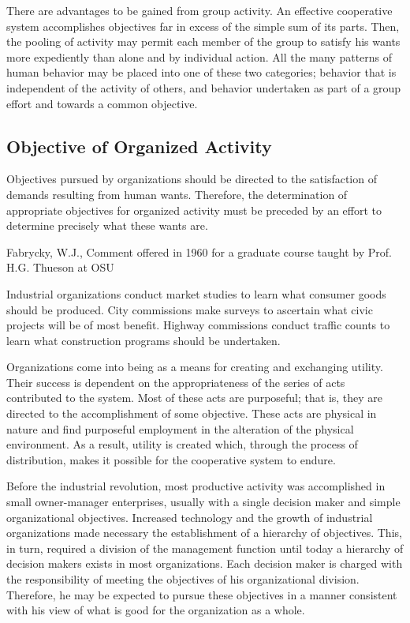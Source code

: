 There are advantages to be gained from group activity. An effective cooperative system accomplishes objectives far in excess of the simple sum of its parts. Then, the pooling of activity may permit each member of the group to satisfy his wants more expediently than alone and by individual action. All the many patterns of human behavior may be placed into one of these two categories; behavior that is independent of the activity of others, and behavior undertaken as part of a group effort and towards a common objective.

\subsection{Objective of Organized Activity}

Objectives pursued by organizations should be directed to the satisfaction of demands resulting from human wants. Therefore, the determination of appropriate objectives for organized activity must be preceded by an effort to determine precisely what these wants are. 

Fabrycky, W.J., Comment offered in 1960 for a graduate course taught by Prof. H.G. Thueson at OSU

Industrial organizations conduct market studies to learn what consumer goods should be produced. City commissions make surveys to ascertain what civic projects will be of most benefit. Highway commissions conduct traffic counts to learn what construction programs should be undertaken.

Organizations come into being as a means for creating and exchanging utility. Their success is dependent on the appropriateness of the series of acts contributed to the system. Most of these acts are purposeful; that is, they are directed to the accomplishment of some objective. These acts are physical in nature and find purposeful employment in the alteration of the physical environment. As a result, utility is created which, through the process of distribution, makes it possible for the cooperative system to endure.

Before the industrial revolution, most productive activity was accomplished in small owner-manager enterprises, usually with a single decision maker and simple organizational objectives. Increased technology and the growth of industrial organizations made necessary the establishment of a hierarchy of objectives.  This, in turn, required a division of the management function until today a hierarchy of decision makers exists in most organizations. Each decision maker is charged with the responsibility of meeting the objectives of his organizational division. Therefore, he may be expected to pursue these objectives in a manner consistent with his view of what is good for the organization as a whole.


